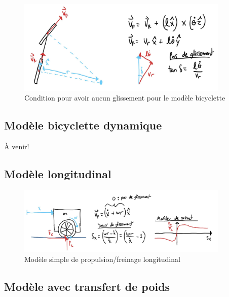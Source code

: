 \begin{figure}[htbp]
	\centering
		\includegraphics[width=0.90\textwidth]{fig/bicyclemodel2.jpg}
	\caption{Condition pour avoir aucun glissement pour le modèle bicyclette}
	\label{fig:bicyclemodel2}
\end{figure}

\subsection{Modèle bicyclette dynamique}

À venir!


\subsection{Modèle longitudinal}

\begin{figure}[htbp]
	\centering
		\includegraphics[width=0.90\textwidth]{fig/longitudinalmodel.jpg}
	\caption{Modèle simple de propulsion/freinage longitudinal}
	\label{fig:longitudinalmodel}
\end{figure}


\subsection{Modèle avec transfert de poids}


